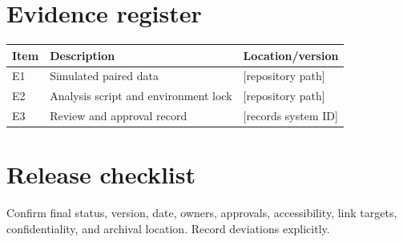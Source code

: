 \chapter{Evidence register}

\begin{tabularx}{\textwidth}{@{}lXl@{}}
  \toprule
  Item & Description & Location/version \\
  \midrule
  E1 & Simulated paired data & [repository path] \\
  E2 & Analysis script and environment lock & [repository path] \\
  E3 & Review and approval record & [records system ID] \\
  \bottomrule
\end{tabularx}

\chapter{Release checklist}
Confirm final status, version, date, owners, approvals, accessibility, link
targets, confidentiality, and archival location. Record deviations explicitly.
